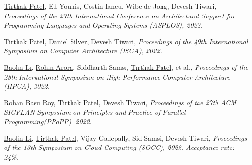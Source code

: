 {\textnormal{\newline \underline{Tirthak Patel}, Ed Younis, Costin Iancu, Wibe de Jong, Devesh Tiwari,}} {\textit{Proceedings of the 27th International Conference on Architectural Support for Programming Languages and Operating Systems (ASPLOS), 2022.\newline}}{}{}{} %

{\textnormal{\newline \underline{Tirthak Patel}, \underline{Daniel Silver}, Devesh Tiwari,}} {\textit{Proceedings of the 49th International Symposium on Computer Architecture (ISCA), 2022.\newline}}{}{}{} %

{\textnormal{\newline \underline{Baolin Li}, \underline{Rohin Arora}, Siddharth Samsi, \underline{Tirthak Patel}, et al.,}} {\textit{Proceedings of the 28th International Symposium on High-Performance Computer Architecture (HPCA), 2022.\newline}}{}{}{} %

{\textnormal{\newline \underline{Rohan Basu Roy}, \underline{Tirthak Patel}, Devesh Tiwari,}} {\textit{Proceedings of the 27th ACM SIGPLAN Symposium on Principles and Practice of Parallel Programming(PPoPP), 2022.\newline}}{}{}{} %

{\textnormal{\newline \underline{Baolin Li}, \underline{Tirthak Patel}, Vijay Gadepally, Sid Samsi, Devesh Tiwari,}} {\textit{Proceedings of the 13th Symposium on Cloud Computing (SOCC), 2022. Acceptance rate: 24\%.\newline}}{}{}{} %

